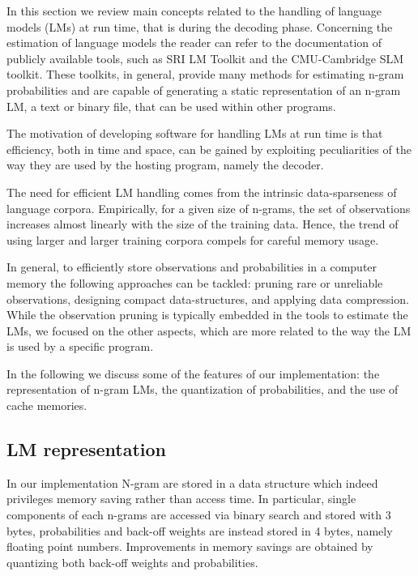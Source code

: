 \documentclass[11pt]{report}
\theoremstyle{plain}
\begin{document}
{In this section we review main concepts related to the handling of language models (LMs) 
at run time, that is during the decoding phase. Concerning the estimation of language 
models the reader can refer to the documentation of publicly available tools, such as 
SRI LM Toolkit and the CMU-Cambridge SLM toolkit.  These toolkits, in general, provide many 
methods for estimating n-gram probabilities and are capable of generating  a static 
representation of an n-gram LM, a text or binary file, that can  be used within other programs.   

The motivation of developing software for handling LMs at run time is that efficiency, both 
in time and space, can be gained by exploiting peculiarities  of the way they are used by the 
hosting program, namely the decoder.  

The need for efficient LM handling comes from the  intrinsic data-sparseness of language corpora. 
Empirically, for a given size of n-grams,   the set of
observations increases  almost linearly with the size  of the training
data.  Hence, the trend of using larger and larger training corpora compels for careful memory
usage.

In general, to efficiently  store observations and probabilities in a
computer  memory the  following approaches  can be  tackled:  pruning  rare or unreliable observations, designing compact data-structures,  and applying data compression. While the observation pruning is typically embedded in the tools to estimate the LMs, we focused
on the other aspects, which are more related to the way the LM is used by a specific program.

In the following we discuss some of the features of our implementation: the representation of 
n-gram LMs, the quantization of probabilities, and  the use of cache memories. 

\subsection{LM representation}
In our implementation N-gram are stored in a data structure which indeed privileges memory
saving rather than access time.  In particular, single components of each n-grams are accessed 
via binary search and stored with 3 bytes, probabilities and back-off weights are instead stored
in 4 bytes, namely  floating point numbers. Improvements in memory savings are obtained by 
quantizing both back-off weights and probabilities. 

}
\end{document}
